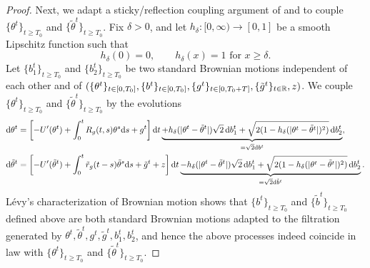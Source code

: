 \begin{proof}
Next, we adapt a sticky/reflection coupling
argument of \cite{eberle2016reflection,eberle2019sticky} and \cite[Lemma
3.3]{fan2025dynamicalII} to couple $\{\theta^t\}_{t \geq T_0}$ and
$\{\tilde \theta^t\}_{t \geq T_0}$.
Fix $\delta>0$, and let $h_\delta:[0,\infty) \to [0,1]$ be a smooth
Lipschitz function such that
\begin{equation}\label{eq:couplingboundary}
h_\delta(0)=0, \qquad h_\delta(x)=1 \text{ for } x \geq \delta.
\end{equation}
Let $\{b_1^t\}_{t \geq T_0}$ and $\{b_2^t\}_{t \geq T_0}$
be two standard Brownian motions independent of each other and of
$(\{\theta^t\}_{t \in [0,T_0]},\{b^t\}_{t \in [0,T_0]},
\{g^t\}_{t \in [0,T_0+T]},\{\tilde g^t\}_{t \in \mathbb{R}},z)$.
We couple $\{\theta^t\}_{t \geq T_0}$ and
$\{\tilde \theta^t\}_{t \geq T_0}$ by the evolutions
\begin{align*}
\mathrm{d} \theta^t&=\left[{-}U'(\theta^t)+\int_0^t R_g(t,s)\theta^s \mathrm{d} s+g^t\right]\mathrm{d} t
\underbrace{+h_\delta(|\theta^t-\tilde \theta^t|)\sqrt{2}\,\mathrm{d} b_1^t
+\sqrt{2(1-h_\delta(|\theta^t-\tilde \theta^t|)^2)}\,\mathrm{d} b_2^t}_{=\sqrt{2} \mathrm{d} b^t},\\
\mathrm{d} \tilde \theta^t&=\left[{-}U'(\tilde \theta^t)+\int_0^t \tilde r_g(t-s)
\tilde \theta^s \mathrm{d} s+\tilde g^t+z\right]\mathrm{d} t
\underbrace{-h_\delta(|\theta^t-\tilde \theta^t|)\sqrt{2}\,\mathrm{d} b_1^t
+\sqrt{2(1-h_\delta(|\theta^t-\tilde \theta^t|)^2)}\,\mathrm{d} b_2^t}_{=\sqrt{2}\mathrm{d} \tilde b^t}.
\end{align*}
L\'evy's characterization of Brownian motion shows that $\{b^t\}_{t \geq T_0}$
and $\{\tilde b^t\}_{t \geq T_0}$ defined above
are both standard Brownian motions adapted to the filtration generated by
$\theta^t,\tilde \theta^t,g^t,\tilde g^t,b_1^t,b_2^t$,
and hence the above processes indeed
coincide in law with $\{\theta^t\}_{t \geq T_0}$ and
$\{\tilde \theta^t\}_{t \geq T_0}$.


\end{proof}
